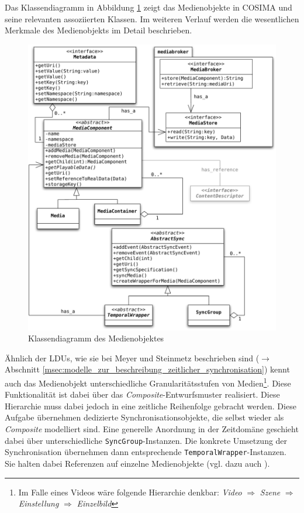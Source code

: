   Das Klassendiagramm in Abbildung \ref{fig:medienobjekt} zeigt das Medienobjekte in COSIMA und seine relevanten assoziierten Klassen. Im weiteren Verlauf werden die wesentlichen Merkmale des Medienobjekts im Detail beschrieben.
  
  \begin{figure}[!ht]
    \centering
      \includegraphics[width=.9\textwidth]{images/Medienobjekt.pdf}
    \caption{Klassendiagramm des Medienobjektes}
    \label{fig:medienobjekt}
  \end{figure}

\label{msec:eigenschaften_des_medienobjektes}

  Ähnlich der LDUs, wie sie bei Meyer und Steinmetz beschrieben sind ($\to$ Abschnitt \ref{msec:modelle_zur_beschreibung_zeitlicher_synchronisation}) kennt auch das Medienobjekt unterschiedliche Granularitätsstufen von Medien\footnote{Im Falle eines Videos wäre folgende Hierarchie denkbar: \emph{Video} $\Rightarrow$ \emph{Szene} $\Rightarrow$ \emph{Einstellung} $\Rightarrow$ \emph{Einzelbild}}. Diese Funktionalität ist dabei über das \emph{Composite}-Entwurfsmuster \citep[S. 163]{design_patterns} realisiert.  Diese Hierarchie muss dabei jedoch in eine zeitliche Reihenfolge gebracht werden. Diese Aufgabe übernehmen dedizierte Synchronisationsobjekte, die selbst wieder als \emph{Composite} modelliert sind. Eine generelle Anordnung in der Zeitdomäne geschieht dabei über unterschiedliche \verb!SyncGroup!-Instanzen. Die konkrete Umsetzung der Synchronisation übernehmen dann entsprechende \verb!TemporalWrapper!-Instanzen. Sie halten dabei Referenzen auf einzelne Medienobjekte (vgl. dazu auch \citep[S. 84]{ackermann1996doo}).
  
